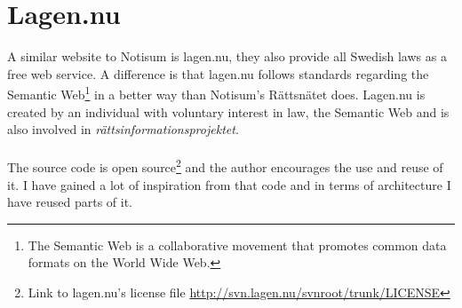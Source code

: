 \section{Lagen.nu}
A similar website to Notisum is lagen.nu, they also provide all Swedish laws as a free web service. A difference is that lagen.nu follows standards regarding the Semantic Web\footnote{The Semantic Web is a collaborative movement that promotes common data formats on the World Wide Web.} in a better way than Notisum's Rättsnätet does. Lagen.nu is created by an individual with voluntary interest in law, the Semantic Web and is also involved in \textit{rättsinformationsprojektet}.\\\\
The source code is open source\footnote{Link to lagen.nu’s license file \url{http://svn.lagen.nu/svnroot/trunk/LICENSE}} and the author encourages the use and reuse of it. I have gained a lot of inspiration from that code and in terms of architecture I have reused parts of it. 

